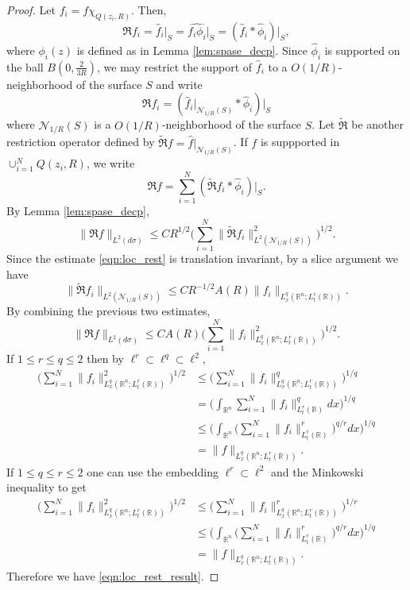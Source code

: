 \documentclass[11pt,reqno]{amsart}
\theoremstyle{plain}
\theoremstyle{definition}
\theoremstyle{remark}
\numberwithin{equation}{section}
\begin{document}
\begin{proof}
Let $f_i = f \chi_{Q(z_i,R)}$. Then,
\[\mathfrak R f_i = \hat f_i \big|_S =\widehat{ f_i \phi_i}\big|_S =  (\hat f_i \ast \hat \phi_i) \big|_S,\] where $\phi_i(z)$ is defined as in Lemma \ref{lem:spase_decp}. Since $\hat \phi_i$ is supported on the ball $B(0,\frac{2}{3R})$, we may restrict the support of $\hat f_i$ to a $O(1/R)$-neighborhood of the surface $S$ and write
\[
\mathfrak R f_i  =  (\hat f_i \big|_{\mathcal N_{1/R} (S)} \ast \hat \phi_i) \big|_S
\]
where $\mathcal N_{1/R} (S)$ is a $O(1/R)$-neighborhood of the surface $S$. Let $\tilde{\mathfrak R}$ be another restriction operator defined by $\tilde{\mathfrak R} f = \hat f \big|_{\mathcal N_{1/R}(S)}$. If $f$ is suppported in $\cup_{i=1}^{N} Q(z_i,R)$, we write
\[
\mathfrak R f = \sum_{i=1}^{N} (\tilde{\mathfrak R}f_i \ast \hat \phi_i) \big|_{S}.
\]
By Lemma \ref{lem:spase_decp},
\[
\|\mathfrak R f \|_{L^2(d\sigma)} \le C R^{1/2} \Big( \sum_{i=1}^{N} \| \tilde{\mathfrak R} f_i \|_{L^2(\mathcal N_{1/R} (S))}^2 \Big)^{1/2}.
\]
Since the estimate \eqref{eqn:loc_rest} is translation invariant, by a slice argument we have
\[
\| \tilde{\mathfrak R} f_i \|_{L^2(\mathcal N_{1/R} (S))}
\le CR^{-1/2} A(R)  \|f_i\|_{L_x^{q}(\mathbb R^n;L_t^r(\mathbb R))}.
\]
By combining the previous two estimates,
\[
\|\mathfrak R f \|_{L^2(d\sigma)} \le C A(R)  \Big( \sum_{i=1}^{N} \|f_i \|^2_{L_{x}^{q}(\mathbb R^n;L_{t}^{r}(\mathbb R))} \Big)^{1/2}.
\]
If $1 \le r \le q \le 2$ then by $\ell^r \subset \ell^{q} \subset \ell^{2}$, 
\begin{align*}
\Big( \sum_{i=1}^{N} \|f_i \|^2_{L_{x}^{q}(\mathbb R^n;L_{t}^{r}(\mathbb R))} \Big)^{1/2}
&\le \Big( \sum_{i=1}^{N} \|f_i \|^q_{L_{x}^{q}(\mathbb R^n;L_{t}^{r}(\mathbb R))} \Big)^{1/q} \\
&=\Big(\int_{\mathbb R^n}\sum_{i=1}^{N}\|f_i\|_{L_t^{r}(\mathbb R)}^{q} dx\Big)^{1/q} \\
&\le \Big(\int_{\mathbb R^n} \Big(\sum_{i=1}^{N}\|f_i\|_{L_t^{r}(\mathbb R)}^{r} \Big)^{q/r} dx \Big)^{1/q} \\
&=\|f\|_{L_{x}^{q}(\mathbb R^n;L_{t}^{ r}(\mathbb R))}.
\end{align*}
%
If $1 \le q \le r \le 2$ one can use the embedding $\ell^r \subset \ell^2$ and the Minkowski inequality to get
\begin{align*}
\Big( \sum_{i=1}^{N} \|f_i \|^2_{L_{x}^{q}(\mathbb R^n;L_{t}^{r}(\mathbb R))} \Big)^{1/2}
&\le \Big( \sum_{i=1}^{N} \|f_i \|^r_{L_{x}^{q}(\mathbb R^n;L_{t}^{r}(\mathbb R))} \Big)^{1/r} \\
&\le \Big(\int_{\mathbb R^n} \Big(\sum_{i=1}^{N}\|f_i\|_{L_t^{r}(\mathbb R)}^{r} \Big)^{q/r} dx\Big)^{1/q} \\
&=\|f\|_{L_{x}^{q}(\mathbb R^n;L_{t}^{ r}(\mathbb R))}.
\end{align*}
Therefore we have \eqref{eqn:loc_rest_result}.
\end{proof}
\end{document}
